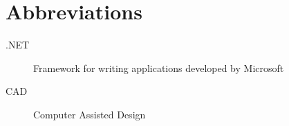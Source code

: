 \chapter{Abbreviations}
\label{ch:abbreviations}

\begin{description}
    \item[.NET] Framework for writing applications developed by Microsoft
    \item[CAD] Computer Assisted Design

\end{description}